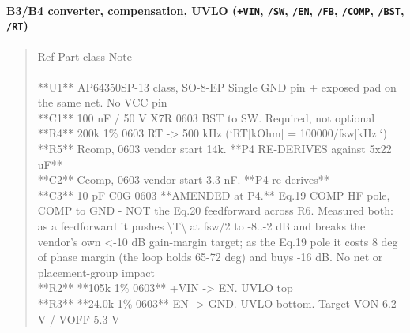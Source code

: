\documentclass[11pt,a4paper]{article}
\begin{document}
\paragraph*{B3/B4 converter, compensation, UVLO (\texttt{+VIN}, \texttt{/SW}, \texttt{/EN}, \texttt{/FB}, \texttt{/COMP}, \texttt{/BST}, \texttt{/RT})}
\begin{quote}\small\ttfamily\raggedright
\textbar{} Ref \textbar{} Part class \textbar{} Note \textbar{}\\
\textbar{}---\textbar{}---\textbar{}---\textbar{}\\
\textbar{} {*}{*}U1{*}{*} \textbar{} AP64350SP-13 class, SO-8-EP \textbar{} Single GND pin + exposed pad on the same net. No VCC pin \textbar{}\\
\textbar{} {*}{*}C1{*}{*} \textbar{} 100 nF / 50 V X7R 0603 \textbar{} BST to SW. Required, not optional \textbar{}\\
\textbar{} {*}{*}R4{*}{*} \textbar{} 200k 1\% 0603 \textbar{} RT -\textgreater{} 500 kHz (`RT{[}kOhm{]} = 100000/fsw{[}kHz{]}`) \textbar{}\\
\textbar{} {*}{*}R5{*}{*} \textbar{} Rcomp, 0603 \textbar{} vendor start 14k. {*}{*}P4 RE-DERIVES against 5x22 uF{*}{*} \textbar{}\\
\textbar{} {*}{*}C2{*}{*} \textbar{} Ccomp, 0603 \textbar{} vendor start 3.3 nF. {*}{*}P4 re-derives{*}{*} \textbar{}\\
\textbar{} {*}{*}C3{*}{*} \textbar{} 10 pF C0G 0603 \textbar{} {*}{*}AMENDED at P4.{*}{*} Eq.19 COMP HF pole, COMP to GND - NOT the Eq.20 feedforward across R6. Measured both: as a feedforward it pushes \textbackslash{}\textbar{}T\textbackslash{}\textbar{} at fsw/2 to -8..-2 dB and breaks the vendor's own \textless{}-10 dB gain-margin target; as the Eq.19 pole it costs 8 deg of phase margin (the loop holds 65-72 deg) and buys -16 dB. No net or placement-group impact \textbar{}\\
\textbar{} {*}{*}R2{*}{*} \textbar{} {*}{*}105k 1\% 0603{*}{*} \textbar{} +VIN -\textgreater{} EN. UVLO top \textbar{}\\
\textbar{} {*}{*}R3{*}{*} \textbar{} {*}{*}24.0k 1\% 0603{*}{*} \textbar{} EN -\textgreater{} GND. UVLO bottom. Target VON 6.2 V / VOFF 5.3 V \textbar{}
\end{quote}
\end{document}
